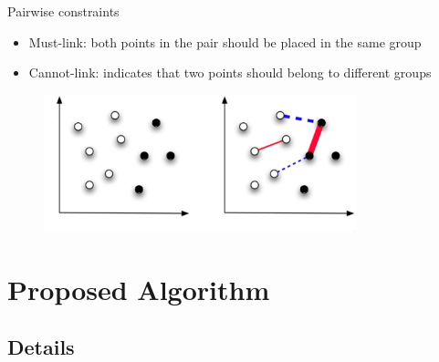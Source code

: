 \documentclass{beamer}
\begin{document}
\begin{frame}{Pairwise constraints}
	\begin{itemize}
	\item{Must-link: both points in the pair should be placed in the same group}
	\item{Cannot-link: indicates that two points should belong to different groups}
	\end{itemize}
	\begin{figure}
		\centering
		\includegraphics[width=0.81\textwidth]{image/pairwise-restrictions.jpg}
	\end{figure}
\end{frame}

\section{Proposed Algorithm}

%
\subsection{Details}

\end{document}
